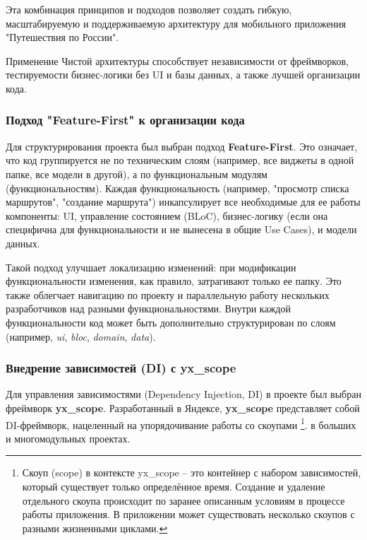 Эта комбинация принципов и подходов позволяет создать гибкую, масштабируемую и поддерживаемую архитектуру для мобильного приложения "Путешествия по России".


Применение Чистой архитектуры способствует независимости от фреймворков, тестируемости бизнес-логики без UI и базы данных, а также лучшей организации кода.

\subsubsection*{Подход "Feature-First" к организации кода}
Для структурирования проекта был выбран подход \textbf{Feature-First}. Это означает, что код группируется не по техническим слоям (например, все виджеты в одной папке, все модели в другой), а по функциональным модулям (функциональностям). Каждая функциональность (например, "просмотр списка маршрутов", "создание маршрута") инкапсулирует все необходимые для ее работы компоненты: UI, управление состоянием (BLoC), бизнес-логику (если она специфична для функциональности и не вынесена в общие Use Cases), и модели данных.

Такой подход улучшает локализацию изменений: при модификации функциональности изменения, как правило, затрагивают только ее папку. Это также облегчает навигацию по проекту и параллельную работу нескольких разработчиков над разными функциональностями. Внутри каждой функциональности код может быть дополнительно структурирован по слоям (например, \textit{ui}, \textit{bloc}, \textit{domain}, \textit{data}).



\subsubsection*{Внедрение зависимостей (DI) с yx\_scope}
Для управления зависимостями (Dependency Injection, DI) в проекте был выбран фреймворк \textbf{yx\_scope}. Разработанный в Яндексе, \textbf{yx\_scope} представляет собой DI-фреймворк, нацеленный на упорядочивание работы со скоупами \footnote{Скоуп (scope) в контексте yx\_scope – это контейнер с набором зависимостей, который существует только определённое время. Создание и удаление отдельного скоупа происходит по заранее описанным условиям в процессе работы приложения. В приложении может существовать несколько скоупов с разными жизненными циклами.}. в больших и многомодульных проектах.

